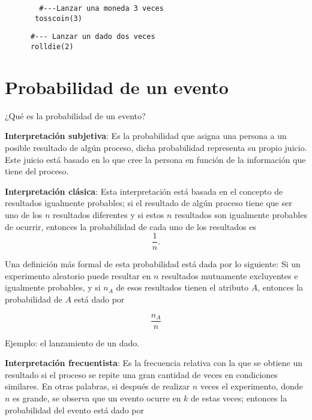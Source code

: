 \begin{lstlisting}
        #---Lanzar una moneda 3 veces
       tosscoin(3)
\end{lstlisting}

\begin{lstlisting}
      #--- Lanzar un dado dos veces
      rolldie(2)
\end{lstlisting}

\section{Probabilidad de un evento}

¿Qué es la probabilidad de un evento?

\textbf{Interpretación subjetiva}: Es la probabilidad que asigna una persona a un posible resultado de algún proceso, dicha probabilidad representa su propio juicio. Este juicio está basado en lo que cree la persona en función de la información que tiene del proceso.

\vspace{5mm}

\textbf{Interpretación clásica}: Esta interpretación está basada en el concepto de resultados igualmente probables; si el resultado de algún proceso tiene que ser uno de los $n$ resultados diferentes y si estos $n$ resultados son igualmente probables de ocurrir, entonces la probabilidad de cada uno de los resultados es 
\begin{equation*}
\frac{1}{n}.
\end{equation*}

Una definición más formal de esta probabilidad está dada por lo siguiente: Si un experimento aleatorio puede resultar en $n$ resultados mutuamente excluyentes e igualmente probables, y si $n_{A}$ de esos resultados tienen el atributo $A$, entonces la probabilidad de $A$ está dado por 

\begin{equation*}
\frac{n_{A}}{n}
\end{equation*}


Ejemplo: el lanzamiento de un dado.

\vspace{5mm}
\textbf{Interpretación frecuentista}: Es la frecuencia relativa con la que se obtiene un resultado si el proceso se repite una gran cantidad de veces en condiciones similares. En otras palabras, si después de realizar $n$ veces el experimento, donde $n$ es grande, se observa que un evento ocurre en $k$ de estas veces; entonces la probabilidad del evento está dado por 


